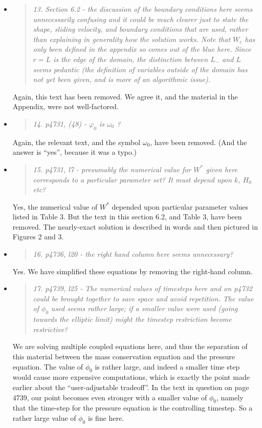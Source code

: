 \documentclass[11pt,reqno]{amsart}
\newcommand{\reply}[2]{
\medskip\medskip
\item  \begin{quote}
\emph{#1}
\end{quote}

\medskip
\noindent #2}
\begin{document}
\begin{itemize}
\reply{13. Section 6.2 - the discussion of the boundary conditions here seems unnecessarily confusing and it could be much clearer just to state the shape, sliding velocity, and boundary conditions that are used, rather than explaining in generality how the solution works. Note that $W_c$ has only been defined in the appendix so comes out of the blue here. Since $r = L$ is the edge of the domain, the distinction between $L_-$ and $L$ seems pedantic (the definition of variables outside of the domain has not yet been given, and is more of an algorithmic issue).}
{Again, this text has been removed.  We agree it, and the material in the Appendix, were not well-factored.}

\reply{14. p4731, (48) - $\varphi_0$ is $\omega_0$ ?}
{Again, the relevant text, and the symbol $\omega_0$, have been removed.  (And the answer is ``yes'', because it was a typo.)}

\reply{15. p4731, l7 - presumably the numerical value for $W^*$ given here corresponds to a particular parameter set? It must depend upon $k$, $H_0$ etc?}
{Yes, the numerical value of $W^*$ depended upon particular parameter values listed in Table 3.  But the text in this section 6.2, and Table 3, have been removed.  The nearly-exact solution is described in words and then pictured in Figures 2 and 3.}

\reply{16. p4736, l20 - the right hand column here seems unnecessary?}
{Yes.  We have simplified these equations by removing the right-hand column.}

\reply{17. p4739, l25 - The numerical values of timesteps here and on p4732 could be brought together to save space and avoid repetition. The value of $\phi_0$ used seems rather large; if a smaller value were used (going towards the elliptic limit) might the timestep restriction become restrictive?}
{We are solving multiple coupled equations here, and thus the separation of this material between the mass conservation equation and the pressure equation.  The value of $\phi_0$ is rather large, and indeed a smaller time step would cause more expensive computations, which is exactly the point made earlier about the ``user-adjustable tradeoff''.  In the text in question on page 4739, our point becomes even stronger with a smaller value of $\phi_0$, namely that the time-step for the pressure equation is the controlling timestep.  So a rather large value of $\phi_0$ is fine here.}


\end{itemize}
\end{document}
